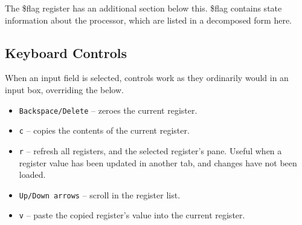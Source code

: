 \documentclass[10pt]{article}
\begin{document}
    The \$flag register has an additional section below this.
    \$flag contains state information about the processor, which are listed in a decomposed form here.

    \subsection{Keyboard Controls}

    When an input field is selected, controls work as they ordinarily would in an input box, overriding the below.

    \begin{itemize}
        \item \texttt{Backspace/Delete} -- zeroes the current register.
        \item \texttt{c} -- copies the contents of the current register.
        \item \texttt{r} -- refresh all registers, and the selected register's pane.
        Useful when a register value has been updated in another tab, and changes have not been loaded.
        \item \texttt{Up/Down arrows} -- scroll in the register list.
        \item \texttt{v} -- paste the copied register's value into the current register.
    \end{itemize}
\end{document}
